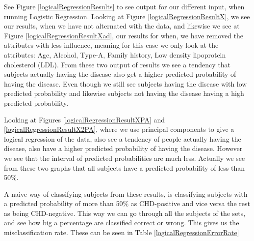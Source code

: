 See Figure \ref{logicalRegressionResults} to see output for our different input, when running Logistic Regression. Looking at Figure \ref{logicalRegressionResultX}, we see our results, when we have not alternated with the data, and likewise we see at Figure \ref{logicalRegressionResultXad}, our results for when, we have removed the attributes with less influence, meaning for this case we only look at the attributes: Age, Alcohol, Type-A, Family history, Low density lipoprotein cholesterol (LDL). From these two output of results we see a tendency that subjects actually having the disease also get a higher predicted probability of having the disease. Even though we still see subjects having the disease with low predicted probability and likewise subjects not having the disease having a high predicted probability.

Looking at Figures \ref{logicalRegressionResultXPA} and \ref{logicalRegressionResultX2PA}, where we use principal components to give a logical regression of the data, also see a tendency of people actually having the disease, also have a higher predicted probability of having the disease. However we see that the interval of predicted probabilities are much less. Actually we see from these two graphs that all subjects have a predicted probability of less than 50\%.

A naive way of classifying subjects from these results, is classifying subjects with a predicted probability of more than 50\% as CHD-positive and vice versa the rest as being CHD-negative. This way we can go through all the subjects of the sets, and see how big a percentage are classified correct or wrong. This gives us the misclassification rate. These can be seen in Table \ref{logicalRegressionErrorRate}

